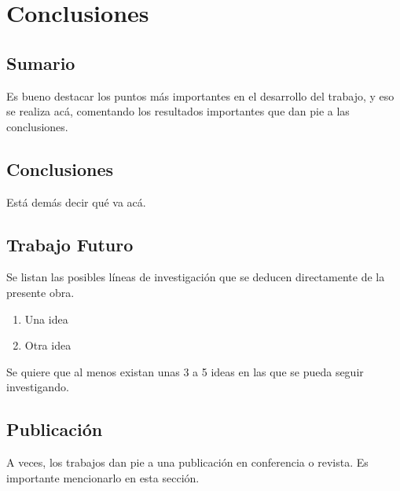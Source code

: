 \chapter{Conclusiones}

\section{Sumario}
Es bueno destacar los puntos más importantes en el desarrollo del trabajo, y eso se realiza acá, comentando los resultados importantes que dan pie a las conclusiones.

\section{Conclusiones}
Está demás decir qué va acá.

\section{Trabajo Futuro}
Se listan las posibles líneas de investigación que se deducen directamente de la presente obra.

\begin{enumerate}
\item Una idea
\item Otra idea
\end{enumerate}

Se quiere que al menos existan unas 3 a 5 ideas en las que se pueda seguir investigando.

\section{Publicación}
A veces, los trabajos dan pie a una publicación en conferencia o revista. Es importante mencionarlo en esta sección.